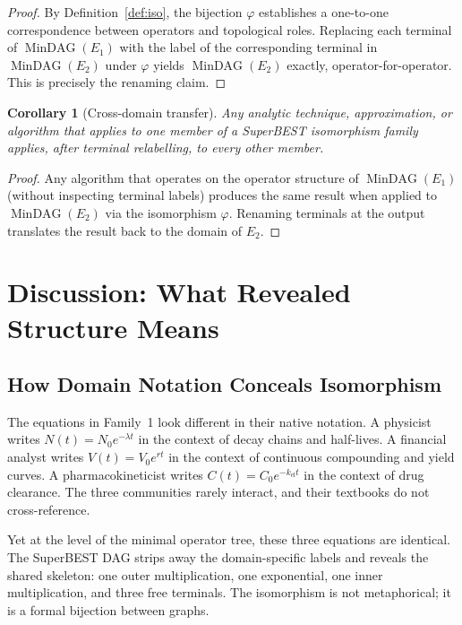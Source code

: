 \documentclass[12pt,a4paper]{article}
\newtheorem{corollary}[theorem]{Corollary}
\theoremstyle{definition}
\newcommand{\MinDAG}{\operatorname{MinDAG}}
\begin{document}
\begin{proof}
By Definition~\ref{def:iso}, the bijection $\varphi$ establishes a one-to-one
correspondence between operators and topological roles.  Replacing each terminal
of $\MinDAG(E_1)$ with the label of the corresponding terminal in $\MinDAG(E_2)$
under $\varphi$ yields $\MinDAG(E_2)$ exactly, operator-for-operator.  This
is precisely the renaming claim.
\end{proof}

\begin{corollary}[Cross-domain transfer]
\label{cor:transfer}
Any analytic technique, approximation, or algorithm that applies to one member
of a SuperBEST isomorphism family applies, after terminal relabelling, to every
other member.
\end{corollary}

\begin{proof}
Any algorithm that operates on the operator structure of $\MinDAG(E_1)$
(without inspecting terminal labels) produces the same result when applied to
$\MinDAG(E_2)$ via the isomorphism $\varphi$.  Renaming terminals at the output
translates the result back to the domain of $E_2$.
\end{proof}

\section{Discussion: What Revealed Structure Means}
\label{sec:discussion}

\subsection{How Domain Notation Conceals Isomorphism}

The equations in Family~1 look different in their native notation.  A physicist
writes $N(t) = N_0 e^{-\lambda t}$ in the context of decay chains and half-lives.
A financial analyst writes $V(t) = V_0 e^{rt}$ in the context of continuous
compounding and yield curves.  A pharmacokineticist writes
$C(t) = C_0 e^{-k_{\mathrm{el}} t}$ in the context of drug clearance.
The three communities rarely interact, and their textbooks do not cross-reference.

Yet at the level of the minimal operator tree, these three equations are
identical.  The SuperBEST DAG strips away the domain-specific labels and reveals
the shared skeleton: one outer multiplication, one exponential, one inner
multiplication, and three free terminals.  The isomorphism is not metaphorical;
it is a formal bijection between graphs.
\end{document}
